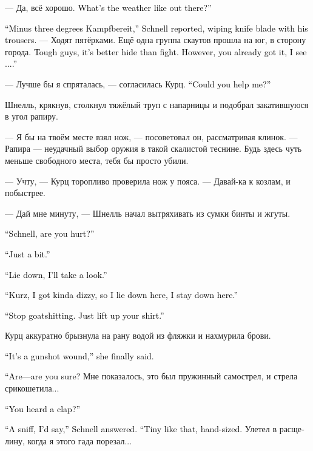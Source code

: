 \documentclass[a4paper,12pt,fleqn]{book}\usepackage{cooltooltips}\usepackage{polyglossia}\setdefaultlanguage[babelshorthands=true]{russian}\setotherlanguage{english}\defaultfontfeatures{Ligatures=TeX,Mapping=tex-text} \usepackage{xcolor}\definecolor{lightgray}{HTML}{bbbbbb}\color{lightgray}\newcommand{\ml}[3]{\textenglish{\textcolor{black}{#3}}}
\begin{document}
--- Да, всё хорошо.
\ml{$0$}
{Как у тебя погода?}
{What's the weather like out there?''}

\ml{$0$}
{--- На улице минус три, --- отрапортовал Шнелль, вытирая лезвие ножа о штаны.}
{``Minus three degrees Kampfbereit,'' Schnell reported, wiping knife blade with his trousers.}
--- Ходят пятёрками.
Ещё одна группа скаутов прошла на юг, в сторону города.
\ml{$0$}
{Ребята очень жёсткие, лучше спрятаться, чем драться.}
{Tough guys, it's better hide than fight.}
\ml{$0$}
{Впрочем, ты и сама поняла, как я вижу...}
{However, you already got it, I see ....''}

--- Лучше бы я спряталась, --- согласилась Курц.
\ml{$0$}
{--- Можешь мне помочь?}
{``Could you help me?''}

Шнелль, крякнув, столкнул тяжёлый труп с напарницы и подобрал закатившуюся в угол рапиру.

--- Я бы на твоём месте взял нож, --- посоветовал он, рассматривая клинок.
--- Рапира --- неудачный выбор оружия в такой скалистой теснине.
Будь здесь чуть меньше свободного места, тебя бы просто убили.

--- Учту, --- Курц торопливо проверила нож у пояса.
--- Давай-ка к козлам, и побыстрее.

--- Дай мне минуту, --- Шнелль начал вытряхивать из сумки бинты и жгуты.

\ml{$0$}
{--- Шнелль, ты ранен?}
{``Schnell, are you hurt?''}

\ml{$0$}
{--- Самую малость.}
{``Just a bit.''}

\ml{$0$}
{--- Ложись, я осмотрю.}
{``Lie down, I'll take a look.''}

\ml{$0$}
{--- Курц, меня немного крутит, так что если я лягу --- я уже не встану.}
{``Kurz, I got kinda dizzy, so I lie down here, I stay down here.''}

\ml{$0$}
{--- Хватит нести чушь.}
{``Stop goatshitting.}
\ml{$0$}
{Просто подними рубаху.}
{Just lift up your shirt.''}

Курц аккуратно брызнула на рану водой из фляжки и нахмурила брови.

\ml{$0$}
{--- Это огнестрел, --- наконец выдала она.}
{``It's a gunshot wound,'' she finally said.}

\ml{$0$}
{--- Т-ты уверена?}
{``Are---are you sure?}
Мне показалось, это был пружинный самострел, и стрела срикошетила...

\ml{$0$}
{--- Он хлопнул?}
{``You heard a clap?''}

\ml{$0$}
{--- Скорее фыркнул, --- задумался Шнелль.}
{``A sniff, I'd say,'' Schnell answered.}
\ml{$0$}
{--- Вот такой маленький, размером с ладошку.}
{``Tiny like that, hand-sized.}
Улетел в расщелину, когда я этого гада порезал...
\end{document}
